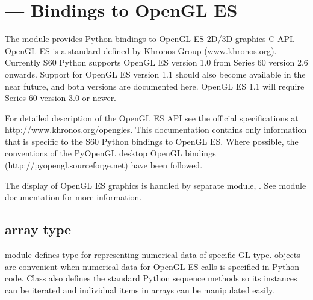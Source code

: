 %
%
%

\section{ ---
  Bindings to OpenGL ES}
\label{sec:gles}


The  module provides Python bindings to OpenGL ES 2D/3D graphics C
API. OpenGL ES is a standard defined by Khronos Group
(www.khronos.org). Currently S60 Python supports OpenGL ES version 1.0 from
Series 60 version 2.6 onwards. Support for OpenGL ES version 1.1 should also
become available in the near future, and both versions are documented
here. OpenGL ES 1.1 will require Series 60 version 3.0 or newer.

For detailed description of the OpenGL ES API see the official specifications at
http://www.khronos.org/opengles. This documentation contains only information
that is specific to the S60 Python bindings to OpenGL ES. Where possible, the
conventions of the PyOpenGL desktop OpenGL bindings
(http://pyopengl.sourceforge.net) have been followed.

The display of OpenGL ES graphics is handled by separate module,
. See  module documentation for more
information.

\subsection{array type}

 module defines  type for representing numerical data of
specific GL type.  objects are convenient when numerical data for
OpenGL ES calls is specified in Python code. Class  also defines
the standard Python sequence methods so its instances can be iterated and
individual items in arrays can be manipulated easily.

